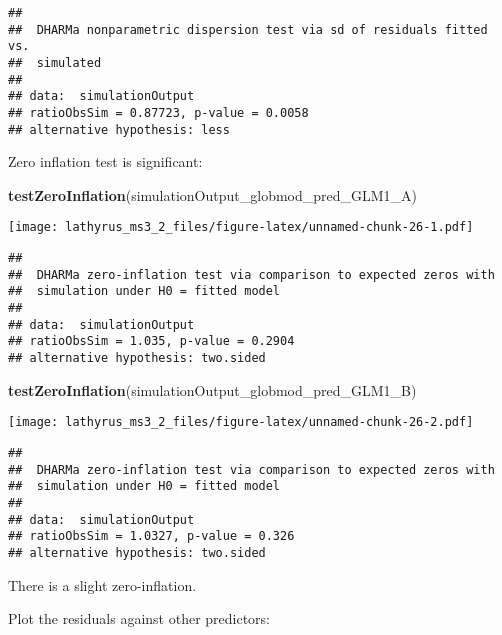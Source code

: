 \documentclass[
]{article}
\newenvironment{Shaded}{\begin{snugshade}}{\end{snugshade}}
\newcommand{\KeywordTok}[1]{\textcolor[rgb]{0.13,0.29,0.53}{\textbf{#1}}}
\newcommand{\NormalTok}[1]{#1}
\begin{document}
\begin{verbatim}
## 
##  DHARMa nonparametric dispersion test via sd of residuals fitted vs.
##  simulated
## 
## data:  simulationOutput
## ratioObsSim = 0.87723, p-value = 0.0058
## alternative hypothesis: less
\end{verbatim}

Zero inflation test is significant:

\begin{Shaded}
\begin{Highlighting}[]
\KeywordTok{testZeroInflation}\NormalTok{(simulationOutput_globmod_pred_GLM1_A)}
\end{Highlighting}
\end{Shaded}

\texttt{[image: lathyrus\_ms3\_2\_files/figure-latex/unnamed-chunk-26-1.pdf]}

\begin{verbatim}
## 
##  DHARMa zero-inflation test via comparison to expected zeros with
##  simulation under H0 = fitted model
## 
## data:  simulationOutput
## ratioObsSim = 1.035, p-value = 0.2904
## alternative hypothesis: two.sided
\end{verbatim}

\begin{Shaded}
\begin{Highlighting}[]
\KeywordTok{testZeroInflation}\NormalTok{(simulationOutput_globmod_pred_GLM1_B)}
\end{Highlighting}
\end{Shaded}

\texttt{[image: lathyrus\_ms3\_2\_files/figure-latex/unnamed-chunk-26-2.pdf]}

\begin{verbatim}
## 
##  DHARMa zero-inflation test via comparison to expected zeros with
##  simulation under H0 = fitted model
## 
## data:  simulationOutput
## ratioObsSim = 1.0327, p-value = 0.326
## alternative hypothesis: two.sided
\end{verbatim}

There is a slight zero-inflation.

Plot the residuals against other predictors:
\end{document}
